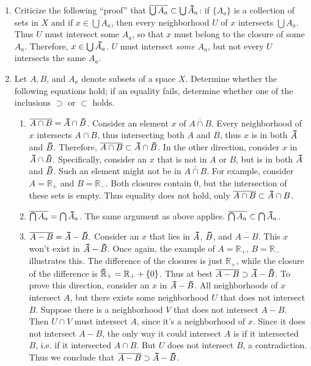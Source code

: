 \documentclass[12pt,letterpaper]{article}
\newcommand{\n}{\break}
\newcommand\thickbar[1]{\accentset{\rule{.4em}{.8pt}}{#1}}
\let\bar\thickbar
\begin{document}
\begin{enumerate}
\begin{enumerate}
    \end{enumerate}
  \item Criticize the following ``proof'' that $\overline{\bigcup A_a} \subset \bigcup \bar{A}_a$: if $\{A_a\}$ is a collection of sets in $X$ and if $x\in\overline{\bigcup A_a}$, then every neighborhood $U$ of $x$ intersects $\bigcup A_a$. Thus $U$ must intersect some $A_a$, so that $x$ must belong to the closure of some $A_a$. Therefore, $x\in\bigcup\bar{A_a}$.\n
    \indent $U$ must intersect \emph{some} $A_a$, but not every $U$ intersects the same $A_a$. 
  \item Let $A, B$, and $A_a$ denote subsets of a space $X$. Determine whether the following equations hold; if an equality fails, determine whether one of the inclusions $\supset$ or $\subset$ holds.
    \begin{enumerate}
    \item $\overline{A\cap B} = \bar{A}\cap\bar{B}$.\hspace{5in}\n
      \indent Consider an element $x$ of $\overline{A \cap B}$. Every neighborhood of $x$ intersects $A\cap B$, thus intersecting both $A$ and $B$, thus $x$ is in both $\bar{A}$ and $\bar{B}$. Therefore, $\overline{A\cap B}\subset \bar{A}\cap\bar{B}$. In the other direction, consider $x$ in $\bar{A}\cap\bar{B}$. Specifically, consider an $x$ that is not in $A$ or $B$, but is in both $\bar{A}$ and $\bar{B}$. Such an element might not be in $\overline{A\cap B}$. For example, consider $A=\mathbb{R}_+$ and $B=\mathbb{R}_-$. Both closures contain $0$, but the intersection of these sets is empty. Thus equality does not hold, only $\overline{A\cap B}\subset \bar{A}\cap{B}$.
    \item $\overline{\bigcap A_a} = \bigcap\bar{A}_a$.\hspace{5in}\n
      \indent The same argument as above applies. $\overline{\bigcap A_a}\subset\bigcap\bar{A}_a$.
    \item $\overline{A-B}=\bar{A}-\bar{B}.$ \hspace{5in}\n
      \indent Consider an $x$ that lies in $\bar{A}$, $\bar{B}$, and $\overline{A-B}$. This $x$ won't exist in $\bar{A}-\bar{B}$. Once again, the example of $A=\mathbb{R}_+$, $B=\mathbb{R}_-$ illustrates this. The difference of the closures is just $\mathbb{R}_+$, while the closure of the difference is $\bar{\mathbb{R}}_+=\mathbb{R}_+ + \{0\}$. Thus at best $\overline{A-B}\supset\bar{A}-\bar{B}$. To prove this direction, consider an $x$ in $\bar{A}-\bar{B}$. All neighborhoods of $x$ intersect $A$, but there exists some neighborhood $U$ that does not intersect $B$. Suppose there is a neighborhood $V$ that does not intersect $A-B$. Then $U\cap V$ must intersect $A$, since it's a neighborhood of $x$. Since it does not intersect $A-B$, the only way it could intersect $A$ is if it intersected $B$, i.e. if it intersected $A\cap B$. But $U$ does not intersect $B$, a contradiction. Thus we conclude that $\overline{A-B}\supset\bar{A}-\bar{B}$.

\end{enumerate}
\end{enumerate}
\end{document}
